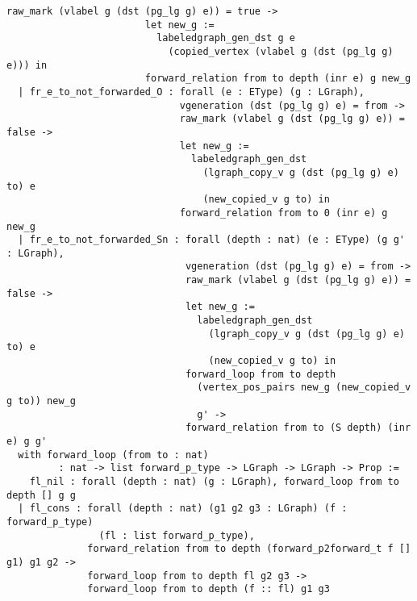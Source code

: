 \documentclass[acmsmall,review,anonymous]{acmart}\settopmatter{printfolios=true,printccs=false,printacmref=false}
\begin{document}
\begin{lstlisting}[basicstyle=\normalfont\tiny\tt]
                        raw_mark (vlabel g (dst (pg_lg g) e)) = true ->
                        let new_g :=
                          labeledgraph_gen_dst g e
                            (copied_vertex (vlabel g (dst (pg_lg g) e))) in
                        forward_relation from to depth (inr e) g new_g
  | fr_e_to_not_forwarded_O : forall (e : EType) (g : LGraph),
                              vgeneration (dst (pg_lg g) e) = from ->
                              raw_mark (vlabel g (dst (pg_lg g) e)) = false ->
                              let new_g :=
                                labeledgraph_gen_dst
                                  (lgraph_copy_v g (dst (pg_lg g) e) to) e
                                  (new_copied_v g to) in
                              forward_relation from to 0 (inr e) g new_g
  | fr_e_to_not_forwarded_Sn : forall (depth : nat) (e : EType) (g g' : LGraph),
                               vgeneration (dst (pg_lg g) e) = from ->
                               raw_mark (vlabel g (dst (pg_lg g) e)) = false ->
                               let new_g :=
                                 labeledgraph_gen_dst
                                   (lgraph_copy_v g (dst (pg_lg g) e) to) e
                                   (new_copied_v g to) in
                               forward_loop from to depth
                                 (vertex_pos_pairs new_g (new_copied_v g to)) new_g
                                 g' ->
                               forward_relation from to (S depth) (inr e) g g'
  with forward_loop (from to : nat)
         : nat -> list forward_p_type -> LGraph -> LGraph -> Prop :=
    fl_nil : forall (depth : nat) (g : LGraph), forward_loop from to depth [] g g
  | fl_cons : forall (depth : nat) (g1 g2 g3 : LGraph) (f : forward_p_type)
                (fl : list forward_p_type),
              forward_relation from to depth (forward_p2forward_t f [] g1) g1 g2 ->
              forward_loop from to depth fl g2 g3 ->
              forward_loop from to depth (f :: fl) g1 g3
\end{lstlisting} 
 
\end{document}
